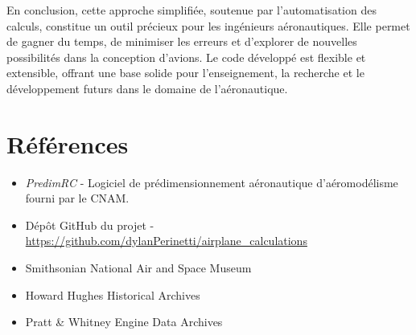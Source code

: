 \documentclass[12pt,a4paper]{article}
\begin{document}
En conclusion, cette approche simplifiée, soutenue par l'automatisation des calculs, constitue un outil précieux pour les ingénieurs aéronautiques. Elle permet de gagner du temps, de minimiser les erreurs et d'explorer de nouvelles possibilités dans la conception d'avions. Le code développé est flexible et extensible, offrant une base solide pour l'enseignement, la recherche et le développement futurs dans le domaine de l'aéronautique.



\section*{Références}

\begin{itemize}
    \item \textit{PredimRC} - Logiciel de prédimensionnement aéronautique d'aéromodélisme fourni par le CNAM.
    \item Dépôt GitHub du projet - \url{https://github.com/dylanPerinetti/airplane_calculations}
    \item Smithsonian National Air and Space Museum
    \item Howard Hughes Historical Archives
    \item Pratt \& Whitney Engine Data Archives
\end{itemize}
\end{document}
